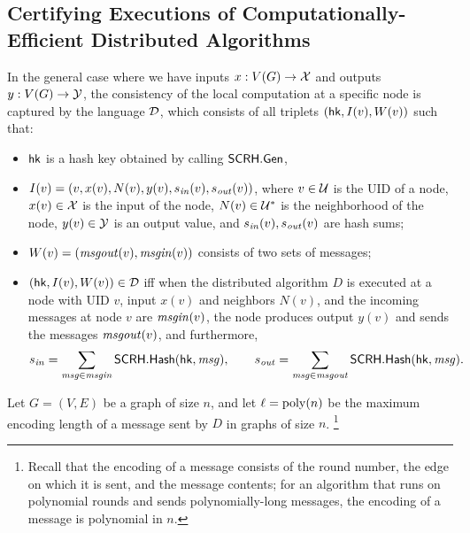 \subsection{Certifying Executions of Computationally-Efficient Distributed Algorithms}
\label{app:distprover}

In the general case where we have inputs $x : V(G) \rightarrow \mathcal{X}$
and outputs $y : V(G) \rightarrow \mathcal{Y}$,
the consistency of the local computation at a specific node is captured
by the
language $\mathcal{D}$,
which consists of all triplets $(\mathsf{hk}, I(v), W(v))$ such that:
\begin{itemize}
	\item $\mathsf{hk}$ is a hash key obtained by calling $\mathsf{SCRH}.\mathsf{Gen}$,
	\item $I(v) = (v, x(v), N(v), y(v), s_{\mathit{ in }}(v), s_{\mathit{ out }}(v))$,
		where
		$v \in \mathcal{U}$ is the UID of a node,
		$x(v) \in \mathcal{X}$ is the input of the node,
		$N(v) \in \mathcal{U}^{\ast}$ is the neighborhood of the node,
		$y(v) \in \mathcal{Y}$ is an output value, and $s_{\mathit{ in }}(v), s_{\mathit{ out }}(v)$ are hash sums;
	\item $W(v) = (\mathit{ msgout }(v), \mathit{ msgin }(v))$ consists of two sets of messages;
	\item $(\mathsf{hk}, I(v), W(v)) \in \mathcal{D}$ iff when the distributed algorithm $D$ is executed 
at a node with UID $v$, input $x(v)$ and neighbors $N(v)$,
and the incoming messages at node $v$ are $\mathit{ msgin }(v)$,
the node produces output $y(v)$ and sends the messages $\mathit{ msgout }(v)$,
and furthermore,
\begin{equation}
	s_{\mathit{ in }} = \sum_{\mathit{ msg } \in \mathit{ msgin }} \mathsf{SCRH}.\mathsf{Hash}(\mathsf{hk}, \mathit{ msg }),
	\qquad
	s_{\mathit{ out }} = \sum_{\mathit{ msg } \in \mathit{ msgout }} \mathsf{SCRH}.\mathsf{Hash}(\mathsf{hk}, \mathit{ msg }).
	\label{cond:msg_hash}
\end{equation}
\end{itemize}


Let $G = (V, E)$ be a graph of size $n$, and let $\ell = \operatorname{poly}(n)$ be the maximum encoding length of
a message sent by $D$ in graphs of size $n$.%
\footnote{Recall that the encoding of a message consists
of the round number, the edge on which it is sent, and the message contents;
for an algorithm that runs on polynomial rounds and sends polynomially-long messages,
the encoding of a message is polynomial in $n$.}


